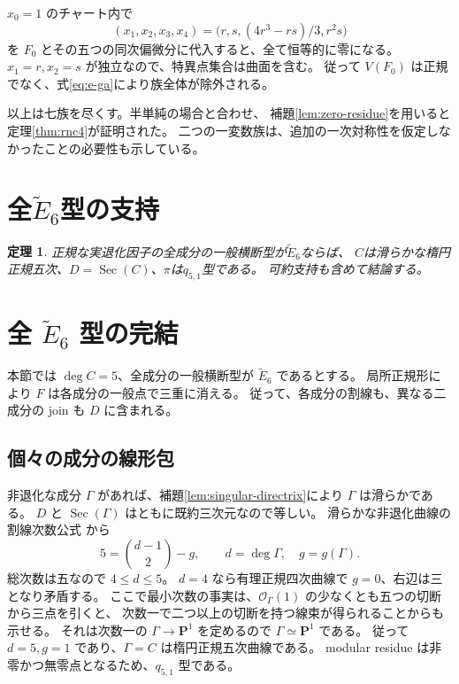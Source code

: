 \documentclass[11pt,a4paper]{ltjsarticle}
\newcommand{\PP}{\mathbf P}\renewcommand{\AA}{\mathbf A}
\newcommand{\OO}{\mathcal O}\newcommand{\FF}{\mathcal F}
\newtheorem{theorem}{定理}[section]
\theoremstyle{remark}\newtheorem{remark}[theorem]{注意}
\begin{document}
$x_0=1$ のチャート内で
\begin{equation}\label{eq:e-surface}
           (x_1,x_2,x_3,x_4)
             =\bigl(r,s,(4r^3-rs)/3,r^2s\bigr)
\end{equation}
を $F_0$ とその五つの同次偏微分に代入すると、全て恒等的に零になる。
$x_1=r,x_2=s$ が独立なので、特異点集合は曲面を含む。
従って $V(F_0)$ は正規でなく、式\eqref{eq:e-ga}により族全体が除外される。

以上は七族を尽くす。半単純の場合と合わせ、
補題\ref{lem:zero-residue}を用いると定理\ref{thm:rnc4}が証明された。
二つの一変数族は、追加の一次対称性を仮定しなかったことの必要性も示している。



\section{全\texorpdfstring{$\widetilde E_6$}{E6}型の支持}\label{sec:e6-input}
\begin{theorem}\label{thm:e6}
正規な実退化因子の全成分の一般横断型が$\widetilde E_6$ならば、
$C$は滑らかな楕円正規五次、$D=\operatorname{Sec}(C)$、$\pi$は$q_{5,1}$型である。
可約支持も含めて結論する。
\end{theorem}


\section{全 \texorpdfstring{$\widetilde E_6$}{E6} 型の完結}\label{sec:e6}

本節では $\deg C=5$、全成分の一般横断型が $\widetilde E_6$ であるとする。
局所正規形により $F$ は各成分の一般点で三重に消える。
従って、各成分の割線も、異なる二成分の join も $D$ に含まれる。

\subsection{個々の成分の線形包}

非退化な成分 $\Gamma$ があれば、補題\ref{lem:singular-directrix}により
$\Gamma$ は滑らかである。
$D$ と $\operatorname{Sec}(\Gamma)$ はともに既約三次元なので等しい。
滑らかな非退化曲線の割線次数公式 \cite[Theorem 3.5]{AMSSecant}から
\begin{equation}\label{eq:e6-secant-degree}
5=\binom{d-1}{2}-g,\qquad d=\deg\Gamma,\quad g=g(\Gamma).
\end{equation}
総次数は五なので $4\le d\le5$。
$d=4$ なら有理正規四次曲線で $g=0$、右辺は三となり矛盾する。
ここで最小次数の事実は、$\OO_\Gamma(1)$ の少なくとも五つの切断から三点を引くと、
次数一で二つ以上の切断を持つ線束が得られることからも示せる。
それは次数一の $\Gamma\to\PP^1$ を定めるので $\Gamma\simeq\PP^1$ である。
従って $d=5,g=1$ であり、$\Gamma=C$ は楕円正規五次曲線である。
modular residue は非零かつ無零点となるため、$q_{5,1}$ 型である。
\end{document}

